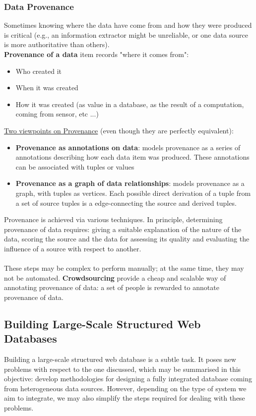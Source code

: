 \documentclass[10pt,a4paper]{article}
\newcommand{\nline}{\\~\\}
\begin{document}
\begin{justify}
\subsubsection{Data Provenance}
Sometimes knowing where the data have come from and how they were produced is critical (e.g., an information extractor might be unreliable, or one data source is more authoritative than others). \\
\textbf{Provenance of a data} item records "where it comes from":
\begin{itemize}
	\item Who created it
	\item When it was created
	\item How it was created (as value in a database, as the result of a computation, coming from sensor, etc ...)
\end{itemize}
\uline{Two viewpoints on Provenance} (even though they are perfectly equivalent):
\begin{itemize}
	\item \textbf{Provenance as annotations on data}: models provenance as a series of annotations describing how each data item was produced. These annotations can be associated with tuples or values
	\item \textbf{Provenance as a graph of data relationships}: models provenance as a graph, with tuples as vertices. Each possible direct derivation of a tuple from a set of source tuples is a edge-connecting the source and derived tuples.
\end{itemize}
Provenance is achieved via various techniques. In principle, determining provenance of data requires: giving a suitable explanation of the nature of the data, scoring the source and the data for assessing its quality and evaluating the influence of a source with respect to another. \nline
These steps may be complex to perform manually; at the same time, they may not be automated. \textbf{Crowdsourcing} provide a cheap and scalable way of annotating provenance of data: a set of people is rewarded to annotate provenance of data. 
\subsection{Building Large-Scale Structured Web Databases}
Building a large-scale structured web database is a subtle task. It poses new problems with respect to the one discussed, which may be summarised in this objective: develop methodologies for designing a fully integrated database coming from heterogeneous data sources. However, depending on the type of system we aim to integrate, we may also simplify the steps required for dealing with these problems.

\end{justify}
\end{document}
